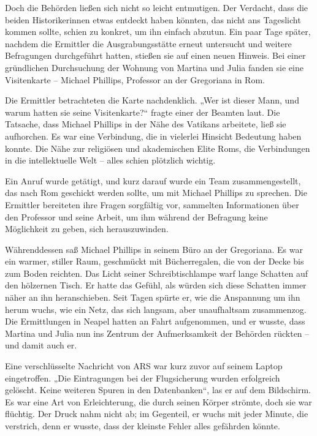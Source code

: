 \documentclass[
]{article}
\begin{document}
Doch die Behörden ließen sich nicht so leicht entmutigen. Der Verdacht,
dass die beiden Historikerinnen etwas entdeckt haben könnten, das nicht
ans Tageslicht kommen sollte, schien zu konkret, um ihn einfach abzutun.
Ein paar Tage später, nachdem die Ermittler die Ausgrabungsstätte erneut
untersucht und weitere Befragungen durchgeführt hatten, stießen sie auf
einen neuen Hinweis. Bei einer gründlichen Durchsuchung der Wohnung von
Martina und Julia fanden sie eine Visitenkarte -- Michael Phillips,
Professor an der Gregoriana in Rom.

Die Ermittler betrachteten die Karte nachdenklich. „Wer ist dieser Mann,
und warum hatten sie seine Visitenkarte?{\kern0pt}`` fragte einer der
Beamten laut. Die Tatsache, dass Michael Phillips in der Nähe des
Vatikans arbeitete, ließ sie aufhorchen. Es war eine Verbindung, die in
vielerlei Hinsicht Bedeutung haben konnte. Die Nähe zur religiösen und
akademischen Elite Roms, die Verbindungen in die intellektuelle Welt --
alles schien plötzlich wichtig.

Ein Anruf wurde getätigt, und kurz darauf wurde ein Team
zusammengestellt, das nach Rom geschickt werden sollte, um mit Michael
Phillips zu sprechen. Die Ermittler bereiteten ihre Fragen sorgfältig
vor, sammelten Informationen über den Professor und seine Arbeit, um ihm
während der Befragung keine Möglichkeit zu geben, sich herauszuwinden.

Währenddessen saß Michael Phillips in seinem Büro an der Gregoriana. Es
war ein warmer, stiller Raum, geschmückt mit Bücherregalen, die von der
Decke bis zum Boden reichten. Das Licht seiner Schreibtischlampe warf
lange Schatten auf den hölzernen Tisch. Er hatte das Gefühl, als würden
sich diese Schatten immer näher an ihn heranschieben. Seit Tagen spürte
er, wie die Anspannung um ihn herum wuchs, wie ein Netz, das sich
langsam, aber unaufhaltsam zusammenzog. Die Ermittlungen in Neapel
hatten an Fahrt aufgenommen, und er wusste, dass Martina und Julia nun
ins Zentrum der Aufmerksamkeit der Behörden rückten -- und damit auch
er.

Eine verschlüsselte Nachricht von ARS war kurz zuvor auf seinem Laptop
eingetroffen. „Die Eintragungen bei der Flugsicherung wurden erfolgreich
gelöscht. Keine weiteren Spuren in den Datenbanken``, las er auf dem
Bildschirm. Es war eine Art von Erleichterung, die durch seinen Körper
strömte, doch sie war flüchtig. Der Druck nahm nicht ab; im Gegenteil,
er wuchs mit jeder Minute, die verstrich, denn er wusste, dass der
kleinste Fehler alles gefährden könnte.
\end{document}
